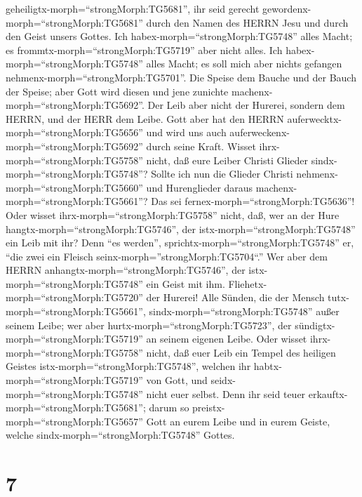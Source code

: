 geheiligtx-morph=``strongMorph:TG5681'', ihr seid gerecht
gewordenx-morph=``strongMorph:TG5681'' durch den Namen des HERRN Jesu
und durch den Geist unsers Gottes.  Ich
habex-morph=``strongMorph:TG5748'' alles Macht; es
frommtx-morph=``strongMorph:TG5719'' aber nicht alles. Ich
habex-morph=``strongMorph:TG5748'' alles Macht; es soll mich aber nichts
gefangen nehmenx-morph=``strongMorph:TG5701''.  Die Speise
dem Bauche und der Bauch der Speise; aber Gott wird diesen und jene
zunichte machenx-morph=``strongMorph:TG5692''. Der Leib aber nicht der
Hurerei, sondern dem HERRN, und der HERR dem Leibe.  Gott
aber hat den HERRN auferwecktx-morph=``strongMorph:TG5656'' und wird uns
auch auferweckenx-morph=``strongMorph:TG5692'' durch seine Kraft.
 Wisset ihrx-morph=``strongMorph:TG5758'' nicht, daß eure
Leiber Christi Glieder sindx-morph=``strongMorph:TG5748''? Sollte ich
nun die Glieder Christi nehmenx-morph=``strongMorph:TG5660'' und
Hurenglieder daraus machenx-morph=``strongMorph:TG5661''? Das sei
fernex-morph=``strongMorph:TG5636''!  Oder wisset
ihrx-morph=``strongMorph:TG5758'' nicht, daß, wer an der Hure
hangtx-morph=``strongMorph:TG5746'', der
istx-morph=``strongMorph:TG5748'' ein Leib mit ihr? Denn ``es werden'',
sprichtx-morph=``strongMorph:TG5748'' er, ``die zwei ein Fleisch
seinx-morph=''strongMorph:TG5704``.''  Wer aber dem HERRN
anhangtx-morph=``strongMorph:TG5746'', der
istx-morph=``strongMorph:TG5748'' ein Geist mit ihm. 
Fliehetx-morph=``strongMorph:TG5720'' der Hurerei! Alle Sünden, die der
Mensch tutx-morph=``strongMorph:TG5661'',
sindx-morph=``strongMorph:TG5748'' außer seinem Leibe; wer aber
hurtx-morph=``strongMorph:TG5723'', der
sündigtx-morph=``strongMorph:TG5719'' an seinem eigenen Leibe.
 Oder wisset ihrx-morph=``strongMorph:TG5758'' nicht, daß
euer Leib ein Tempel des heiligen Geistes
istx-morph=``strongMorph:TG5748'', welchen ihr
habtx-morph=``strongMorph:TG5719'' von Gott, und
seidx-morph=``strongMorph:TG5748'' nicht euer selbst.  Denn
ihr seid teuer erkauftx-morph=``strongMorph:TG5681''; darum so
preistx-morph=``strongMorph:TG5657'' Gott an eurem Leibe und in eurem
Geiste, welche sindx-morph=``strongMorph:TG5748'' Gottes.

\hypertarget{section-6}{%
\section{7}\label{section-6}}

